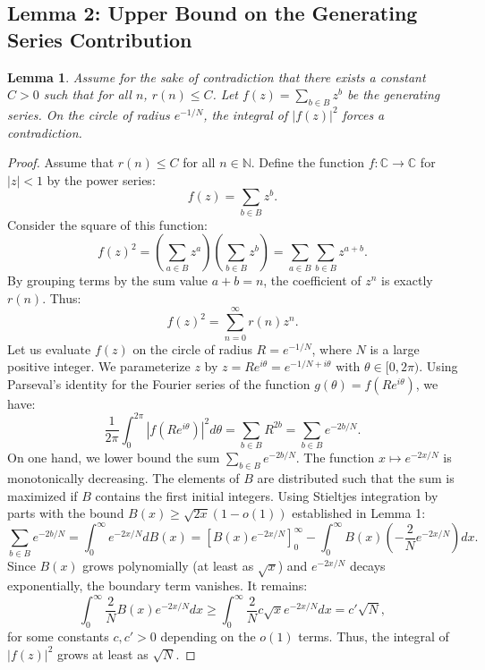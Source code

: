 \documentclass[11pt,a4paper]{article}
\newtheorem{lemma}[theorem]{Lemma}
\begin{document}
\subsection{Lemma 2: Upper Bound on the Generating Series Contribution}
\begin{lemma}
Assume for the sake of contradiction that there exists a constant $C > 0$ such that for all $n$, $r(n) \le C$. Let $f(z) = \sum_{b \in B} z^b$ be the generating series. On the circle of radius $e^{-1/N}$, the integral of $|f(z)|^2$ forces a contradiction.
\end{lemma}
\begin{proof}
Assume that $r(n) \le C$ for all $n \in \mathbb{N}$.
Define the function $f : \mathbb{C} \to \mathbb{C}$ for $|z| < 1$ by the power series:
\begin{equation}
f(z) = \sum_{b \in B} z^b.
\end{equation}
Consider the square of this function:
\begin{equation}
f(z)^2 = \left(\sum_{a \in B} z^a\right) \left(\sum_{b \in B} z^b\right) = \sum_{a \in B} \sum_{b \in B} z^{a+b}.
\end{equation}
By grouping terms by the sum value $a + b = n$, the coefficient of $z^n$ is exactly $r(n)$. Thus:
\begin{equation}
f(z)^2 = \sum_{n=0}^\infty r(n) z^n.
\end{equation}
Let us evaluate $f(z)$ on the circle of radius $R = e^{-1/N}$, where $N$ is a large positive integer. We parameterize $z$ by $z = R e^{i\theta} = e^{-1/N + i\theta}$ with $\theta \in [0, 2\pi)$.
Using Parseval's identity for the Fourier series of the function $g(\theta) = f(R e^{i\theta})$, we have:
\begin{equation}
\frac{1}{2\pi} \int_{0}^{2\pi} |f(R e^{i\theta})|^2 d\theta = \sum_{b \in B} R^{2b} = \sum_{b \in B} e^{-2b/N}.
\end{equation}
On one hand, we lower bound the sum $\sum_{b \in B} e^{-2b/N}$. The function $x \mapsto e^{-2x/N}$ is monotonically decreasing.
The elements of $B$ are distributed such that the sum is maximized if $B$ contains the first initial integers.
Using Stieltjes integration by parts with the bound $B(x) \ge \sqrt{2x}(1 - o(1))$ established in Lemma 1:
\begin{equation}
\sum_{b \in B} e^{-2b/N} = \int_{0}^\infty e^{-2x/N} dB(x) = \left[ B(x) e^{-2x/N} \right]_0^\infty - \int_{0}^\infty B(x) \left(-\frac{2}{N} e^{-2x/N}\right) dx.
\end{equation}
Since $B(x)$ grows polynomially (at least as $\sqrt{x}$) and $e^{-2x/N}$ decays exponentially, the boundary term vanishes. It remains:
\begin{equation}
\int_{0}^\infty \frac{2}{N} B(x) e^{-2x/N} dx \ge \int_{0}^\infty \frac{2}{N} c \sqrt{x} e^{-2x/N} dx = c' \sqrt{N},
\end{equation}
for some constants $c, c' > 0$ depending on the $o(1)$ terms. Thus, the integral of $|f(z)|^2$ grows at least as $\sqrt{N}$.


\end{proof}
\end{document}
